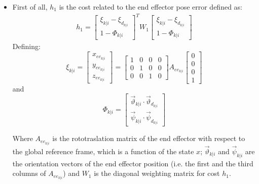 \begin{itemize}

\item First of all, $h_1$ is the cost related to the end effector pose error defined as: 
\begin{equation}
\begin{split}
h_1 = \left[\begin{matrix} \xi_{k|i}-\xi_{{d}_{k|i}} \\ 1-\Phi_{k|i} \end{matrix}\right]^T W_1\left[\begin{matrix} \xi_{k|i}-\xi_{{d}_{k|i}} \\ 1-\Phi_{k|i}\end{matrix}\right]\textbf{}
\end{split}
\end{equation}
Defining:
\begin{equation} 
\xi_{k|i} = \left[ \begin{matrix} x_{{ee}_{k|i}} \\ y_{{ee}_{k|i}} \\ z_{{ee}_{k|i}} 
\end{matrix} \right] = \left[ \begin{matrix}
1 & 0 & 0 & 0 \\ 0 & 1 & 0 & 0 \\ 0 & 0 & 1 & 0
\end{matrix} \right]A_{{ee}_{k|i}}\left[ \begin{matrix}
0 \\ 0 \\ 0 \\ 1
\end{matrix} \right]
\end{equation} 
and
\begin{equation}
\Phi_{k|i}=\left[\begin{matrix}\vec{\vartheta}_{k|i}\cdot\vec{\vartheta}_{d_{k|i}}\\ \vec{\psi}_{k|i}\cdot\vec{\psi}_{d_{k|i}}
\end{matrix}\right] 
\end{equation}

Where $A_{{ee}_{k|i}}$ is the rototraslation matrix of the end effector with respect to the global reference frame, which is a function of the state $x$;  $\vec{\vartheta}_{k|i}$ and $\vec{\psi}_{k|i}$ are the orientation vectors of the end effector position (i.e. the first and the third columns of $A_{{ee}_{k|i}}$) and $W_1$ is the diagonal weighting matrix for cost $h_1$.


\end{itemize}
